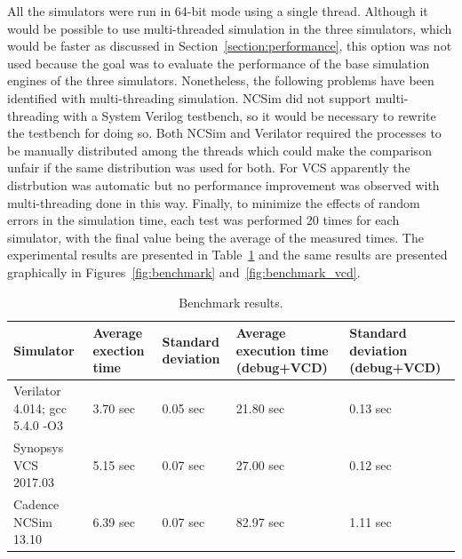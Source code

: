 All the simulators were run in 64-bit mode using a single thread. Although it
would be possible to use multi-threaded simulation in the three simulators,
which would be faster as discussed in Section~\ref{section:performance}, this option
was not used because the goal was to evaluate the performance of the base
simulation engines of the three simulators. Nonetheless, the following problems
have been identified with multi-threading simulation. NCSim did not support
multi-threading with a System Verilog testbench, so it would be necessary to rewrite the
testbench for doing so. Both NCSim and Verilator required the processes to be
manually distributed among the threads which could make the comparison unfair if
the same distribution was used for both. For VCS apparently the distrbution was
automatic but no performance improvement was observed with multi-threading done
in this way. Finally, to minimize the effects of random errors in the simulation
time, each test was performed 20 times for each simulator, with the final value
being the average of the measured times. The experimental results are presented
in Table~\ref{tab:benchmark} and the same results are presented graphically in
Figures~\ref{fig:benchmark} and~\ref{fig:benchmark_vcd}.

\begin{table}[!htb]
	\renewcommand{\arraystretch}{1.2} %
	\caption{Benchmark results.}
	\label{tab:benchmark}
	\centering
	\begin{tabular}{lp{1.9cm}p{1.6cm}p{2.9cm}p{2.9cm}}
		\toprule
		Simulator & Average exection time & Standard deviation & Average execution time 
		(debug+VCD) &
		Standard deviation (debug+VCD)\\
		\midrule
		Verilator 4.014; gcc 5.4.0 -O3  & 3.70 sec & 0.05 sec & 21.80 sec & 0.13 sec\\
		Synopsys VCS 2017.03 & 5.15 sec & 0.07 sec & 27.00 sec & 0.12 sec\\
		Cadence NCSim 13.10 & 6.39 sec & 0.07 sec & 82.97 sec & 1.11 sec\\
		\bottomrule
	\end{tabular}
\end{table}

